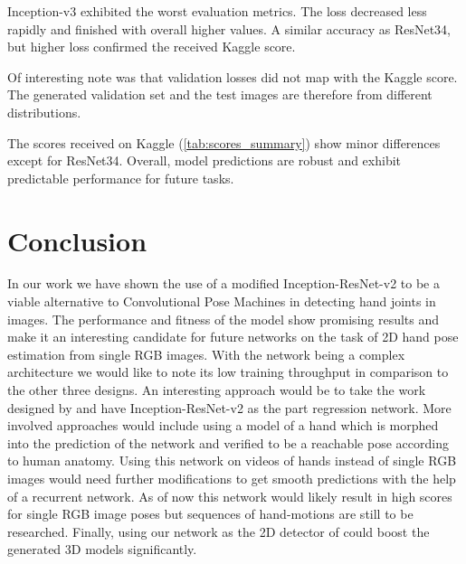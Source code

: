 Inception-v3 exhibited the worst evaluation metrics. The loss decreased less rapidly and finished with overall higher values. A similar accuracy as ResNet34, but higher loss confirmed the received Kaggle score.

Of interesting note was that validation losses did not map with the Kaggle score. The generated validation set and the test images are therefore from different distributions.

The scores received on Kaggle (\autoref{tab:scores_summary}) show minor differences except for ResNet34. Overall, model predictions are robust and exhibit predictable performance for future tasks. 

\section{Conclusion}
In our work we have shown the use of a modified Inception-ResNet-v2 to be a viable alternative to Convolutional Pose Machines in detecting hand joints in images. The performance and fitness of the model show promising results and make it an interesting candidate for future networks on the task of 2D hand pose estimation from single RGB images. With the network being a complex architecture we would like to note its low training throughput in comparison to the other three designs. An interesting approach would be to take the work designed by \citeauthor{DBLP:journals/corr/BulatT16} and have Inception-ResNet-v2 as the part regression network. More involved approaches would include using a model of a hand which is morphed into the prediction of the network and verified to be a reachable pose according to human anatomy. Using this network on videos of hands instead of single RGB images would need further modifications to get smooth predictions with the help of a recurrent network. As of now this network would likely result in high scores for single RGB image poses but sequences of hand-motions are still to be researched. Finally, using our network as the 2D detector of \citet{DBLP:journals/corr/ZimmermannB17} could boost the generated 3D models significantly.

